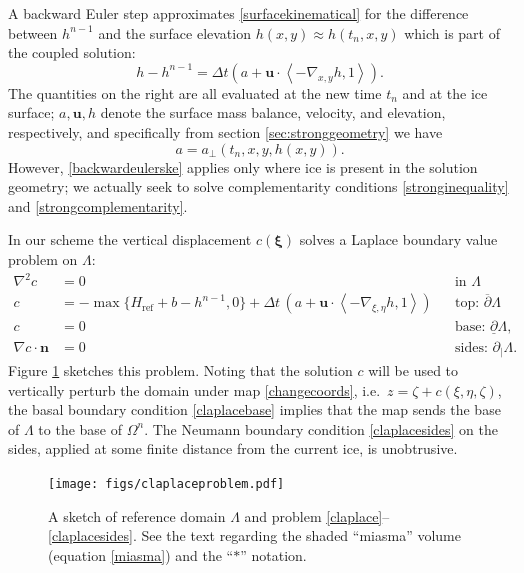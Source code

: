 \documentclass[letterpaper,final,12pt,reqno]{amsart}
\newcommand{\grad}{\nabla}
\newcommand{\bn}{\mathbf{n}}
\newcommand{\bu}{\mathbf{u}}
\newcommand{\bxi}{\bm{\xi}}
\newcommand{\Href}{H_{\text{ref}}}
\begin{document}
A backward Euler step approximates \eqref{surfacekinematical} for the difference between $h^{n-1}$ and the surface elevation $h(x,y) \approx h(t_n,x,y)$ which is part of the coupled solution:
\begin{equation}
h - h^{n-1} = \Delta t\left(a + \bu \cdot \left<-\grad_{x,y} h,1\right>\right). \label{backwardeulerske}
\end{equation}
The quantities on the right are all evaluated at the new time $t_n$ and at the ice surface; $a,\bu,h$ denote the surface mass balance, velocity, and elevation, respectively, and specifically from section \ref{sec:stronggeometry} we have
\begin{equation}
a=a_{\perp}(t_n,x,y,h(x,y)). \label{definea}
\end{equation}
However, \eqref{backwardeulerske} applies only where ice is present in the solution geometry; we actually seek to solve complementarity conditions \eqref{stronginequality} and \eqref{strongcomplementarity}.

In our scheme the vertical displacement $c(\bxi)$ solves a Laplace boundary value problem on $\Lambda$:
\begin{align}
        \grad^2 c &= 0 &&\text{in } \Lambda \label{claplace} \\
                c &= -\max\{\Href + b - h^{n-1},0\} + \Delta t\,(a + \bu \cdot \left<-\grad_{\xi,\eta}h,1\right>) &&\text{top: } \overline{\partial} \Lambda  \label{claplacetop} \\
                c &= 0 &&\text{base: } \underline{\partial} \Lambda,  \label{claplacebase} \\
 \grad c\cdot \bn &= 0 &&\text{sides: } \partial_{|} \Lambda.  \label{claplacesides}
\end{align}
Figure \ref{fig:claplaceproblem} sketches this problem.  Noting that the solution $c$ will be used to vertically perturb the domain under map \eqref{changecoords}, i.e.~$z=\zeta+c(\xi,\eta,\zeta)$, the basal boundary condition \eqref{claplacebase} implies that the map sends the base of $\Lambda$ to the base of $\Omega^n$.  The Neumann boundary condition \eqref{claplacesides} on the sides, applied at some finite distance from the current ice, is unobtrusive.

\begin{figure}[ht]
\begin{center}
\texttt{[image: figs/claplaceproblem.pdf]}
\end{center}
\caption{A sketch of reference domain $\Lambda$ and problem \eqref{claplace}--\eqref{claplacesides}.  See the text regarding the shaded ``miasma'' volume (equation \eqref{miasma}) and the ``$\ast$'' notation.}
\label{fig:claplaceproblem}
\end{figure}
\end{document}
